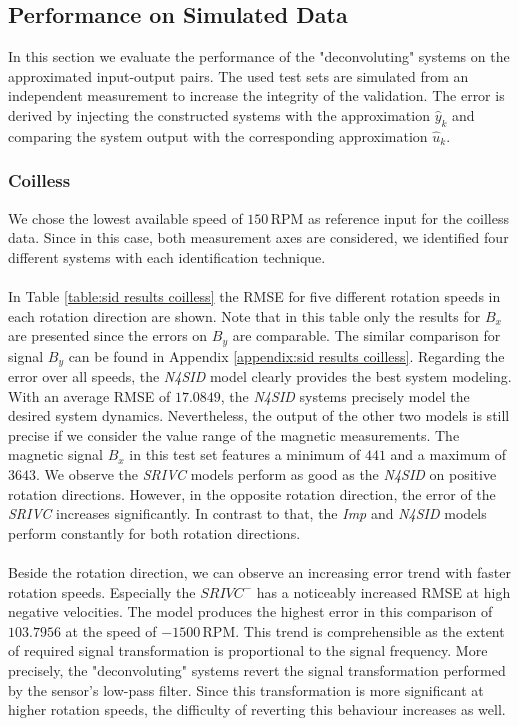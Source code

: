 \documentclass[english]{isasthesis}
\begin{document}
  		\subsection{Performance on Simulated Data}
  		In this section we evaluate the performance of the "deconvoluting" systems on the approximated input-output pairs. The used test sets are simulated from an independent measurement to increase the integrity of the validation. The error is derived by injecting the constructed systems with the approximation $\hat{y}_k$ and comparing the system output with the corresponding approximation $\hat{u}_k$. 
  		\subsubsection{Coilless}
  		We chose the lowest available speed of $150\,$RPM as reference input for the coilless data. Since in this case, both measurement axes are considered, we identified four different systems with each identification technique.\\\\
  		 In Table \ref{table:sid results coilless} the RMSE for five different rotation speeds in each rotation direction are shown. Note that in this table only the results for $B_x$ are presented since the errors on $B_y$ are comparable. The similar comparison for signal $B_y$ can be found in Appendix \ref{appendix:sid results coilless}.  Regarding the error over all speeds, the \textit{N4SID} model clearly provides the best system modeling.
  		  With an average RMSE of $17.0849$, the \textit{N4SID} systems precisely model the desired system dynamics. Nevertheless, the output of the other two models is still precise if we consider the value range of the magnetic measurements. The magnetic signal $B_x$ in this test set features a minimum of $441$ and a maximum of $3643$. We observe the \textit{SRIVC} models perform as good as the \textit{N4SID} on positive rotation directions. However, in the opposite rotation direction, the error of the \textit{SRIVC} increases significantly. In contrast to that, the \textit{Imp} and \textit{N4SID} models perform constantly for both rotation directions. \\\\  	 		  Beside the rotation direction, we can observe an increasing error trend with faster rotation speeds. Especially the $\textit{SRIVC}^-$ has a noticeably increased RMSE at high negative velocities. The model produces the highest error in this comparison of $103.7956$ at the speed of $-1500\,$RPM. This trend is comprehensible as the extent of required signal transformation is proportional to the signal frequency. More precisely, the "deconvoluting" systems revert the signal transformation performed by the sensor's low-pass filter. Since this transformation is more significant at higher rotation speeds, the difficulty of reverting this behaviour increases as well. 
\end{document}
